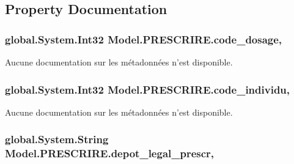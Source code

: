 \subsection{Property Documentation}
\hypertarget{class_model_1_1_p_r_e_s_c_r_i_r_e_a7d149f06b9852794be2b5246e0bedaf3}{
\subsubsection[{code\-\_\-dosage}]{\setlength{\rightskip}{0pt plus 5cm}global.\-System.\-Int32 Model.\-P\-R\-E\-S\-C\-R\-I\-R\-E.\-code\-\_\-dosage\hspace{0.3cm}{\ttfamily [get]}, {\ttfamily [set]}}}\label{class_model_1_1_p_r_e_s_c_r_i_r_e_a7d149f06b9852794be2b5246e0bedaf3}


Aucune documentation sur les métadonnées n'est disponible. 

\hypertarget{class_model_1_1_p_r_e_s_c_r_i_r_e_adb817829898cdf62b98e9e3ac19f43ae}{
\subsubsection[{code\-\_\-individu}]{\setlength{\rightskip}{0pt plus 5cm}global.\-System.\-Int32 Model.\-P\-R\-E\-S\-C\-R\-I\-R\-E.\-code\-\_\-individu\hspace{0.3cm}{\ttfamily [get]}, {\ttfamily [set]}}}\label{class_model_1_1_p_r_e_s_c_r_i_r_e_adb817829898cdf62b98e9e3ac19f43ae}


Aucune documentation sur les métadonnées n'est disponible. 

\hypertarget{class_model_1_1_p_r_e_s_c_r_i_r_e_a9b74be9f296f7872642b907acd30f857}{
\subsubsection[{depot\-\_\-legal\-\_\-prescr}]{\setlength{\rightskip}{0pt plus 5cm}global.\-System.\-String Model.\-P\-R\-E\-S\-C\-R\-I\-R\-E.\-depot\-\_\-legal\-\_\-prescr\hspace{0.3cm}{\ttfamily [get]}, {\ttfamily [set]}}}\label{class_model_1_1_p_r_e_s_c_r_i_r_e_a9b74be9f296f7872642b907acd30f857}


